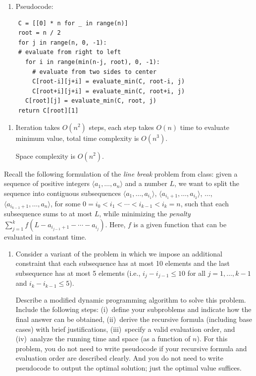 \documentclass[11pt]{article}
\begin{document}
\begin{description}
\begin{enumerate}
  Space complexity is $O(n)$ using rolling array.

  \medskip
  \item[(b)] Pseudocode:
\end{enumerate}
\begin{verbatim}
    C = [[0] * n for _ in range(n)]
    root = n / 2
    for j in range(n, 0, -1):       
    # evaluate from right to left
      for i in range(min(n-j, root), 0, -1):   
        # evaluate from two sides to center
        C[root-i][j+i] = evaluate_min(C, root-i, j)
        C[root+i][j+i] = evaluate_min(C, root+i, j)
      C[root][j] = evaluate_min(C, root, j)
    return C[root][1]
\end{verbatim}
\begin{enumerate}
  \item[] Iteration takes $O(n^2)$ steps, each step takes $O(n)$ time to evaluate minimum value, 
  total time complexity is $O(n^3)$.

  Space complexity is $O(n^2)$.
\end{enumerate}



\newpage
\item[Problem 2.2:]
Recall the following formulation of the \emph{line break} problem from class:
given a sequence of positive integers $\langle a_1,\ldots,a_n\rangle$ and a number $L$,
we want to split the sequence into contiguous subsequences
$\langle a_1,\ldots,a_{i_1}\rangle$,
$\langle a_{i_1+1},\ldots,a_{i_2}\rangle$, $\ldots$,
$\langle a_{i_{k-1}+1},\ldots,a_n\rangle$,
for some $0=i_0<i_1<\cdots<i_{k-1}<i_k=n$,
such that each subsequence sums to at most $L$,
while minimizing the \emph{penalty} $\sum_{j=1}^k f(L-a_{i_{j-1}+1}-\cdots-a_{i_j})$.
Here, $f$ is a given function that can be evaluated in constant time.

\begin{enumerate}
\item[(a)] Consider a variant of the problem in which we impose an additional constraint that each subsequence has at most 10 elements and the last subsequence has at most 5 elements (i.e., $i_j-i_{j-1}\le 10$ for all $j=1,\ldots,k-1$ and $i_k-i_{k-1}\le 5$).

Describe a modified dynamic programming algorithm to solve
this problem.  
Include
the following steps: (i)~define your subproblems and indicate how the final answer can be obtained, (ii)~derive the recursive formula (including base cases) with
brief justifications, (iii)~specify a valid evaluation order, and
(iv)~analyze the running time and space (as a function of $n$).
For this problem, you do not need to write pseudocode if your recursive formula and evaluation order are described clearly.
And you do not need to write pseudocode to 
output the optimal solution; just the optimal value suffices.


\end{enumerate}
\end{description}
\end{document}
